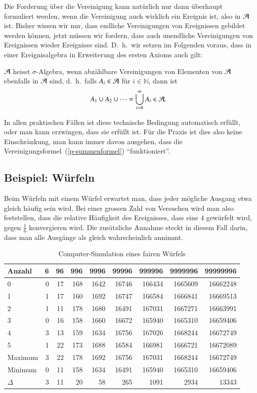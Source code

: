 Die Forderung über die Vereinigung kann natürlich nur dann überhaupt
formuliert werden, wenn die Vereinigung auch wirklich ein Ereignis ist, also in
$\cal A$ ist.
Bisher wissen wir nur, dass endliche
Vereinigungen von Ereignissen gebildet werden können, jetzt müssen
wir fordern, dass
auch unendliche Vereinigungen von Ereignissen wieder Ereignisse sind.
D.~h.~wir setzen im Folgenden voraus, dass in einer
Ereignisalgebra in Erweiterung des ersten Axioms auch gilt:

\begin{definition}
$\cal A$ heisst 
$\sigma$-Algebra, wenn 
abzählbare Vereinigungen von Elementen von $\cal A$ ebenfalls
in $\cal A$ sind, d.~h.~falls $A_i\in{\cal A}$ für $i\in\mathbb{N}$, dann ist
\[
A_1\cup A_2\cup\dots=\bigcup_{i=0}^{\infty}A_i \in{\cal A}.
\]
\end{definition}

In allen praktischen Fällen ist diese technische Bedingung automatisch
erfüllt, oder man kann erzwingen, dass sie erfüllt ist.
Für die Praxis ist dies also keine Einschränkung, man kann immer davon
ausgehen, dass die Vereinigungsformel~(\ref{p-summenformel}) ``funktioniert''.

\subsection{Beispiel: Würfeln}
Beim Würfeln mit einem Würfel erwartet man, dass jeder mögliche
Ausgang etwa gleich häufig sein wird.
Bei einer grossen Zahl von
Versuchen wird man also feststellen, dass die relative Häufigkeit
des Ereignisses, dass eine $4$ gewürfelt wird, gegen $\frac16$
konvergieren wird.
Die zusätzliche Annahme steckt in diesem Fall
darin, dass man alle Ausgänge als gleich wahrscheinlich annimmt.

\begin{table}
\begin{center}
\begin{tabular}{|l|r|r|r|r|r|r|r|r|}
\hline
Anzahl&6&96&996&9996&99996&999996&9999996&99999996\\
\hline
0& 0& 17& 168& 1642& 16746& 166434& 1665609& 16662248\\
1& 1& 17& 160& 1692& 16747& 166584& 1666841& 16669513\\
2& 1& 11& 178& 1680& 16491& 167031& 1667271& 16663991\\
3& 0& 16& 158& 1660& 16672& 165940& 1665310& 16659406\\
4& 3& 13& 159& 1634& 16756& 167026& 1668244& 16672749\\
5& 1& 22& 173& 1688& 16584& 166981& 1666721& 16672089\\
\hline
Maximum& 3& 22& 178& 1692& 16756& 167031& 1668244& 16672749\\
Minimum& 0& 11& 158& 1634& 16491& 165940& 1665310& 16659406\\
$\Delta$& 3& 11& 20& 58& 265& 1091& 2934& 13343\\
\hline
\end{tabular}
\end{center}
\caption{Computer-Simulation eines fairen Würfels\label{wuerfel-simulation}}
\end{table}

